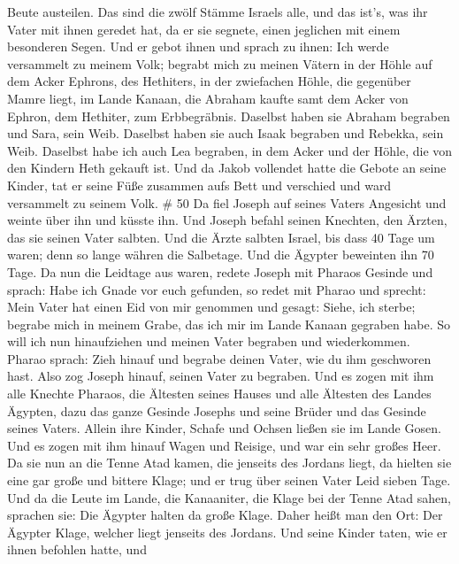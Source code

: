 Beute austeilen.  Das sind die zwölf Stämme Israels alle,
und das ist's, was ihr Vater mit ihnen geredet hat, da er sie segnete,
einen jeglichen mit einem besonderen Segen.  Und er gebot
ihnen und sprach zu ihnen: Ich werde versammelt zu meinem Volk; begrabt
mich zu meinen Vätern in der Höhle auf dem Acker Ephrons, des Hethiters,
 in der zwiefachen Höhle, die gegenüber Mamre liegt, im
Lande Kanaan, die Abraham kaufte samt dem Acker von Ephron, dem
Hethiter, zum Erbbegräbnis.  Daselbst haben sie Abraham
begraben und Sara, sein Weib. Daselbst haben sie auch Isaak begraben und
Rebekka, sein Weib. Daselbst habe ich auch Lea begraben, 
in dem Acker und der Höhle, die von den Kindern Heth gekauft ist.
 Und da Jakob vollendet hatte die Gebote an seine Kinder,
tat er seine Füße zusammen aufs Bett und verschied und ward versammelt
zu seinem Volk. \# 50  Da fiel Joseph auf seines Vaters
Angesicht und weinte über ihn und küsste ihn.  Und Joseph
befahl seinen Knechten, den Ärzten, das sie seinen Vater salbten. Und
die Ärzte salbten Israel,  bis dass 40 Tage um waren; denn
so lange währen die Salbetage. Und die Ägypter beweinten ihn 70 Tage.
 Da nun die Leidtage aus waren, redete Joseph mit Pharaos
Gesinde und sprach: Habe ich Gnade vor euch gefunden, so redet mit
Pharao und sprecht:  Mein Vater hat einen Eid von mir
genommen und gesagt: Siehe, ich sterbe; begrabe mich in meinem Grabe,
das ich mir im Lande Kanaan gegraben habe. So will ich nun hinaufziehen
und meinen Vater begraben und wiederkommen.  Pharao sprach:
Zieh hinauf und begrabe deinen Vater, wie du ihm geschworen hast.
 Also zog Joseph hinauf, seinen Vater zu begraben. Und es
zogen mit ihm alle Knechte Pharaos, die Ältesten seines Hauses und alle
Ältesten des Landes Ägypten,  dazu das ganze Gesinde Josephs
und seine Brüder und das Gesinde seines Vaters. Allein ihre Kinder,
Schafe und Ochsen ließen sie im Lande Gosen.  Und es zogen
mit ihm hinauf Wagen und Reisige, und war ein sehr großes Heer.
 Da sie nun an die Tenne Atad kamen, die jenseits des
Jordans liegt, da hielten sie eine gar große und bittere Klage; und er
trug über seinen Vater Leid sieben Tage.  Und da die Leute
im Lande, die Kanaaniter, die Klage bei der Tenne Atad sahen, sprachen
sie: Die Ägypter halten da große Klage. Daher heißt man den Ort: Der
Ägypter Klage, welcher liegt jenseits des Jordans.  Und
seine Kinder taten, wie er ihnen befohlen hatte,  und
